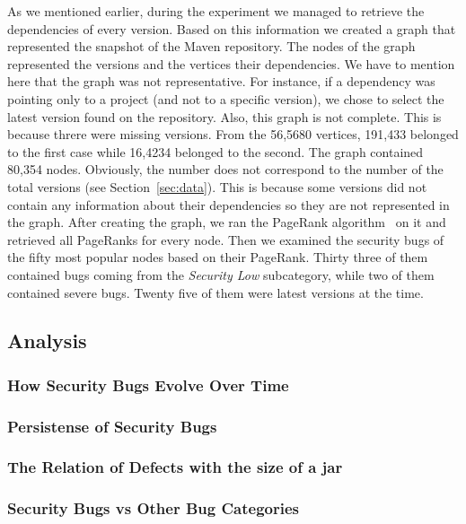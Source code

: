 \documentclass[conference]{llncs}
\begin{document}
As we mentioned earlier, during the experiment we managed to retrieve the
dependencies of every version. Based on this information we created a graph
that represented the snapshot of the Maven repository. The
nodes of the graph represented the versions and the vertices their dependencies.
We have to mention here that the graph was not representative. For instance, if
a dependency was pointing only to a project (and not to a specific version), we chose to
select the latest version found on the repository. Also, this graph is not
complete. This is because threre were missing versions.
From the 56,5680 vertices, 191,433
belonged to the first case while 16,4234 belonged to the second.
The graph contained 80,354 nodes. Obviously, the number does not correspond to
the number of the total versions (see Section~\ref{sec:data}). This is because
some versions did not contain any information about their dependencies so they
are not represented in the graph. After creating the graph, we ran the PageRank
algorithm~\cite{BP98} on it and retrieved all PageRanks for every node. Then we
examined the security bugs of the fifty most popular nodes based on their PageRank.
Thirty three of them contained bugs coming from the {\it Security Low} subcategory,
while two of them contained severe bugs. Twenty five of them were latest
versions at the time.

\subsection{Analysis}
\label{sec:analysis}

\subsubsection{How Security Bugs Evolve Over Time}

\subsubsection{Persistense of Security Bugs}

\subsubsection{The Relation of Defects with the size of a {\sc jar}}

\subsubsection{Security Bugs {\sc vs} Other Bug Categories}
\end{document}
